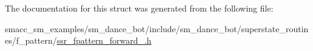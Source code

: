 The documentation for this struct was generated from the following file\+:\begin{DoxyCompactItemize}
\item 
smacc\+\_\+sm\+\_\+examples/sm\+\_\+dance\+\_\+bot/include/sm\+\_\+dance\+\_\+bot/superstate\+\_\+routines/f\+\_\+pattern/\hyperlink{ssr__fpattern__forward__1_8h}{ssr\+\_\+fpattern\+\_\+forward\+\_.\+h}\end{DoxyCompactItemize}

